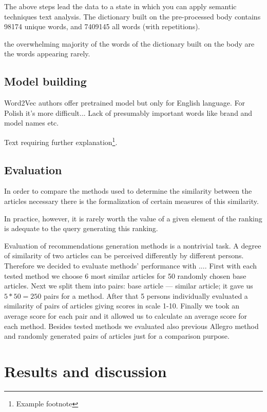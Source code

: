 \documentclass[twoside,twocolumn]{article}
\begin{document}
	
	The above steps lead the data to a state in which you can apply semantic techniques
	text analysis. The dictionary built on the pre-processed body contains 98174 unique
	words, and 7409145 all words (with repetitions).
	
	the overwhelming majority of the words of the dictionary built on the body are the words appearing
	rarely.
	\subsection{Model building}
	
	
	Word2Vec authors offer pretrained model but only for English language. For Polish it's more difficult...
	Lack of presumably important words like brand and model names etc.  
	
	Text requiring further explanation\footnote{Example footnote}.
	
	\subsection{Evaluation}
	
	In order to compare the methods used to determine the similarity between the articles necessary
	there is the formalization of certain measures of this similarity.
	
	
	In practice, however, it is rarely worth the value of a given element of the ranking
	is adequate to the query generating this ranking.
	
	Evaluation of recommendations generation methods is a nontrivial task. A degree of similarity of two articles can be perceived differently by different persons. Therefore we decided to evaluate methods' performance with .... First with each tested method we choose 6 most similar articles for 50 randomly chosen base articles. Next we split them into pairs: base article --- similar article; it gave us $5*50=250$ pairs for a method. After that 5 persons individually evaluated a similarity of pairs of articles giving scores in scale 1-10. Finally we took an average score for each pair and it allowed us to calculate an average score for each method. Besides tested methods we evaluated also previous Allegro method and randomly generated pairs of articles just for a comparison purpose.
	
	
	
	
	\section{Results and discussion}
	
\end{document}
